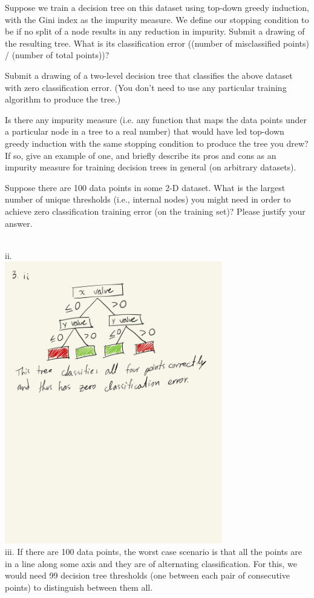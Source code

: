 \subproblem[5] Suppose we train a decision tree on this dataset using top-down greedy induction, with the Gini index as
the impurity measure. We define our stopping condition to be if no split of a node
results in any reduction in impurity. Submit a drawing of the resulting tree.  What is its classification error ((number of misclassified points) / (number of total points))?

\subproblem[5] Submit a drawing of a two-level decision tree that classifies the above dataset with zero classification error.  (You don't need to use any particular training algorithm to produce the tree.)

Is there any impurity measure (i.e. any function that maps the data points under a particular node in a tree to a real number) that would have led top-down greedy induction with the same stopping condition to produce the tree you drew?  If so, give an example of one, and briefly describe its pros and cons as an impurity measure for training decision trees in general (on arbitrary datasets). 

\subproblem[5] Suppose there are 100 data points in some 2-D dataset. What is the largest number of unique thresholds (i.e., internal nodes) you might need in order to achieve zero classification training error (on the training set)? Please
justify your answer.

\begin{solution}
    \\
    ii. \\
    \includegraphics[width=9.5cm]{images/P1_C_ii.JPG} \\
    iii. If there are 100 data points, the worst case scenario is that all the points are in a line along some axis and they are of alternating classification. For this, we would need 99 decision tree thresholds (one between each pair of consecutive points) to distinguish between them all.
\end{solution}

